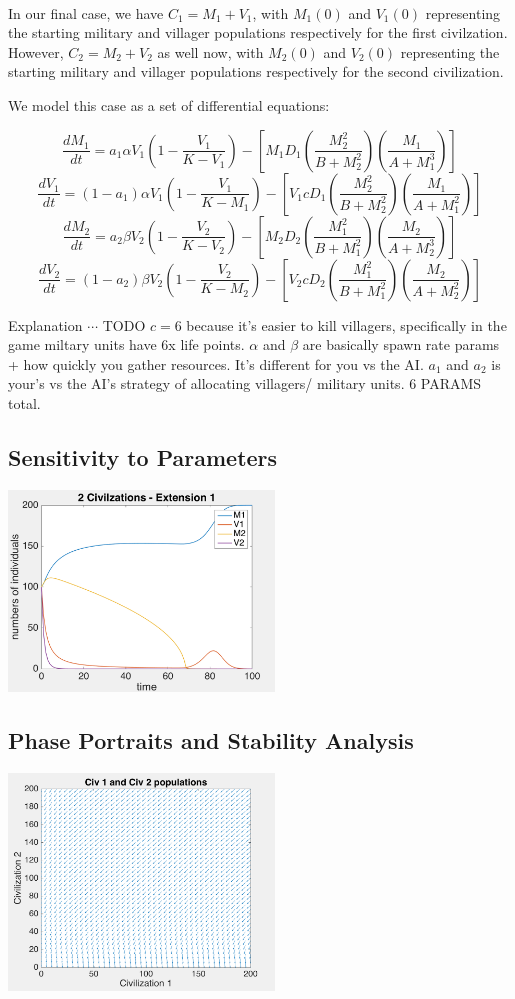 \documentclass[12pt]{article}
\begin{document}
\paragraph{}
In our final case, we have $C_1 = M_1 + V_1$, with $M_1(0)$ and $V_1(0)$ representing the starting military and villager populations respectively for the first civilzation. However, $C_2 = M_2 + V_2$ as well now, with $M_2(0)$ and $V_2(0)$ representing the starting military and villager populations respectively for the second civilization. \par

We model this case as a set of differential equations: 

$$\frac{dM_1}{dt}=a_1 \alpha V_1(1-\frac{V_1}{K-V_1})-[M_1D_1(\frac{M_2^2}{B+M_2^2})(\frac{M_1}{A+M_1^3})]$$
$$\frac{dV_1}{dt}=(1 - a_1) \alpha V_1(1-\frac{V_1}{K-M_1})-[V_1c D_1(\frac{M_2^2}{B+M_2^2})(\frac{M_1}{A +M_1^2})]$$
$$\frac{dM_2}{dt}=a_2 \beta V_2(1-\frac{V_2}{K-V_2})-[M_2 D_2(\frac{M_1^2}{B+M_1^2})(\frac{M_2}{A +M_2^3})] $$
$$\frac{dV_2}{dt}=(1 - a_2) \beta V_2(1-\frac{V_2}{K-M_2})-[V_2 c D_2(\frac{M_1^2}{B+M_1^2})(\frac{M_2}{A +M_2^2})] $$

Explanation $\cdots$ TODO $c = 6$ because it's easier to kill villagers, specifically in the game miltary units have 6x life points. $\alpha$ and $\beta$ are basically spawn rate params + how quickly you gather resources. It's different for you vs the AI. $a_1$ and $a_2$ is your's vs the AI's strategy of allocating villagers/ military units. 6 PARAMS total.

\subsection{Sensitivity to Parameters}
\includegraphics[width=200pt]{examplesim2}

\subsection{Phase Portraits and Stability Analysis}
\includegraphics[width=200pt]{phase3}
\end{document}
